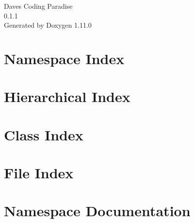 \documentclass[twoside]{book}
\newcommand{\+}{\discretionary{\mbox{\scriptsize$\hookleftarrow$}}{}{}}
\newcommand{\clearemptydoublepage}{%
    \newpage{\pagestyle{empty}\cleardoublepage}%
  }
\begin{document}
  \raggedbottom
    \hypersetup{pageanchor=false,
                bookmarksnumbered=true,
                pdfencoding=unicode
               }
  \begin{titlepage}
  \vspace*{7cm}
  \begin{center}%
  {\Large Daves Coding Paradise}\\
  [1ex]\large 0.\+1.\+1 \\
  \vspace*{1cm}
  {\large Generated by Doxygen 1.11.0}\\
  \end{center}
  \end{titlepage}
  \clearemptydoublepage
  \tableofcontents
  \clearemptydoublepage
  \hypersetup{pageanchor=true}








\chapter{Namespace Index}

\chapter{Hierarchical Index}

\chapter{Class Index}

\chapter{File Index}

\chapter{Namespace Documentation}


\end{document}
